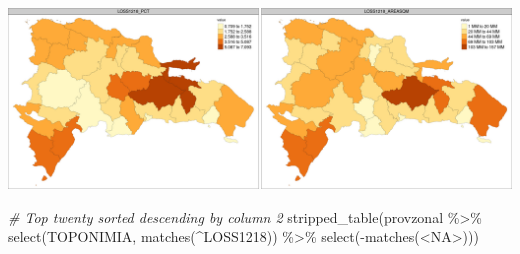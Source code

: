 \documentclass[10pt,landscape,a3paper]{article}
\newenvironment{Shaded}{\begin{snugshade}}{\end{snugshade}}
\newcommand{\CommentTok}[1]{\textcolor[rgb]{0.56,0.35,0.01}{\textit{#1}}}
\newcommand{\FunctionTok}[1]{\textcolor[rgb]{0.00,0.00,0.00}{#1}}
\newcommand{\NormalTok}[1]{#1}
\newcommand{\SpecialCharTok}[1]{\textcolor[rgb]{0.00,0.00,0.00}{#1}}
\newcommand{\StringTok}[1]{\textcolor[rgb]{0.31,0.60,0.02}{#1}}
\begin{document}
\begin{center}\includegraphics{img/zonal-prov-5} \end{center}

\begin{Shaded}
\begin{Highlighting}[]
\CommentTok{\# Top twenty sorted descending by column 2}
\FunctionTok{stripped\_table}\NormalTok{(provzonal }\SpecialCharTok{\%\textgreater{}\%} \FunctionTok{select}\NormalTok{(TOPONIMIA, }\FunctionTok{matches}\NormalTok{(}\StringTok{\textquotesingle{}\^{}LOSS1218\textquotesingle{}}\NormalTok{)) }\SpecialCharTok{\%\textgreater{}\%} \FunctionTok{select}\NormalTok{(}\SpecialCharTok{{-}}\FunctionTok{matches}\NormalTok{(}\StringTok{\textquotesingle{}\textless{}NA\textgreater{}\textquotesingle{}}\NormalTok{)))}
\end{Highlighting}
\end{Shaded}
\end{document}
